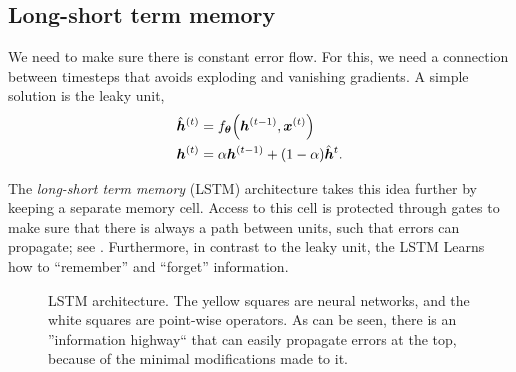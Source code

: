 \subsection{Long-short term memory}

We need to make sure there is constant error flow. For this, we need a connection between timesteps
that avoids exploding and vanishing gradients. A simple solution is the leaky unit,
\begin{align*}
    \hat{\vec{h}}^{(t)} & = f_{\vec{\theta}}\lft(\vec{h}^{(t-1)}, \vec{x}^{(t)}\rgt) \\
    \vec{h}^{(t)}       & = \alpha \vec{h}^{(t-1)} + (1- \alpha) \hat{\vec{h}}^{t}.
\end{align*}

The \textit{long-short term memory} (LSTM) architecture \citep{hochreiter1997long} takes this idea
further by keeping a separate memory cell. Access to this cell is protected through gates to make
sure that there is always a path between units, such that errors can propagate; see
. Furthermore, in contrast to the leaky unit, the LSTM Learns how to ``remember''
and ``forget'' information.

\begin{figure}
    \centering
    \caption{LSTM architecture. The yellow squares are neural networks, and the white squares are point-wise operators. As can be seen, there is an ''information highway`` that can easily propagate errors at the top, because of the minimal modifications made to it.}
    \label{fig:lstm}
\end{figure}

